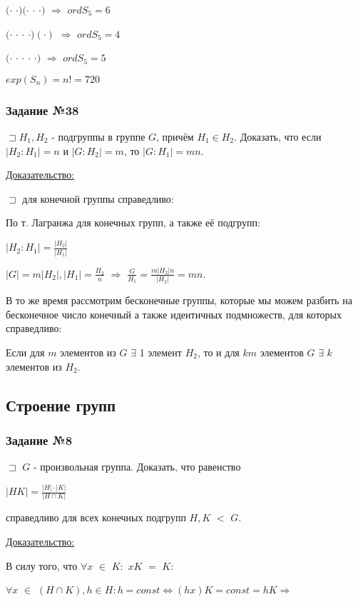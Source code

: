 \documentclass[utf8,14pt,a4paper,oneside,russian]{book}
\begin{document}
	$(\cdot$ $\cdot)(\cdot$ $\cdot$ $\cdot)$ $\Rightarrow$ $ordS_{5}=6$
	
	$(\cdot$ $\cdot$ $\cdot$ $\cdot)(\cdot)$ $\Rightarrow$ $ordS_{5}=4$
	
	$(\cdot$ $\cdot$ $\cdot$ $\cdot$ $\cdot)$ $\Rightarrow$ $ordS_{5}=5$	
	
	$exp(S_{n})=n!=720$	
	
	\subsubsection{Задание №38}
	$\sqsupset H_{1},H_{2}$ - подгруппы в группе $G$, причём $H_{1}\in H_{2}$. Доказать, что если $|H_{2}:H_1|=n$ и $|G:H_{2}|=m$, то $|G:H_{1}|=mn$.
	
	\underline{Доказательство:}
	
	$\sqsupset$ для конечной группы справедливо: 
	
	По т. Лагранжа для конечных групп, а также её подгрупп:
	
	$|H_{2}:H_{1}|=\frac{|H_{2}|}{|H_{1}|}$
	
	$|G|=m|H_{2}|,|H_{1}|=\frac{H_{2}}{n}$ $\Rightarrow$ $\frac{G}{H_{1}}=\frac{m|H_{2}|n}{|H_{2}|}=mn$.
	
	В то же время рассмотрим бесконечные группы, которые мы можем разбить на бесконечное число конечный а также идентичных подмножеств, для которых справедливо:
	
	Если для $m$ элементов из $G$ $\exists$ 1 элемент $H_{2}$, то и для $km$ элементов $G$ $\exists$ $k$ элементов из $H_{2}$.
	
	\newpage
	
	\subsection{Строение групп}
	\subsubsection{Задание №8}
	$\sqsupset$ $G$ - произвольная группа. Доказать, что равенство 
	
	$|HK|=\frac{|H|\cdot|K|}{|H\cap K|}$
	
	справедливо для всех конечных подгрупп $H,K$ $<$ $G$.
	
	\underline{Доказательство:}
	
	В силу того, что $\forall x$ $\in$ $K:$ $xK$ $=$ $K$:
	
	$\forall x$ $\in$ $(H\cap K), h\in H:h=const\Leftrightarrow (hx)K=const=hK\Rightarrow$
	
\end{document}
